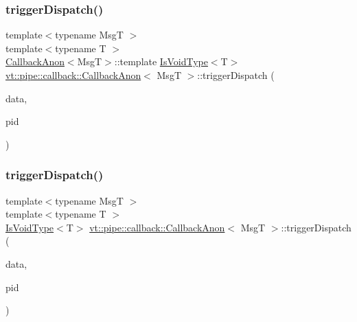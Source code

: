 \subsubsection{\texorpdfstring{trigger\+Dispatch()}{triggerDispatch()}\hspace{0.1cm}{\footnotesize\ttfamily [1/4]}}
{\footnotesize\ttfamily template$<$typename MsgT $>$ \\
template$<$typename T $>$ \\
\hyperlink{structvt_1_1pipe_1_1callback_1_1_callback_anon}{Callback\+Anon}$<$MsgT$>$\+::template \hyperlink{structvt_1_1pipe_1_1callback_1_1_callback_anon_a3aa19d4a1044d57ba4af22015331c20a}{Is\+Void\+Type}$<$T$>$ \hyperlink{structvt_1_1pipe_1_1callback_1_1_callback_anon}{vt\+::pipe\+::callback\+::\+Callback\+Anon}$<$ MsgT $>$\+::trigger\+Dispatch (\begin{DoxyParamCaption}\item[{\hyperlink{structvt_1_1pipe_1_1callback_1_1_callback_anon_ac503b95feb44bb0b60c1d69e1ed29074}{Signal\+Data\+Type} $\ast$}]{data,  }\item[{\hyperlink{namespacevt_ac9852acda74d1896f48f406cd72c7bd3}{Pipe\+Type} const \&}]{pid }\end{DoxyParamCaption})}

\mbox{\label{structvt_1_1pipe_1_1callback_1_1_callback_anon_a71cd1781a5f639ddf5e2aac775c1d397}} 
\subsubsection{\texorpdfstring{trigger\+Dispatch()}{triggerDispatch()}\hspace{0.1cm}{\footnotesize\ttfamily [2/4]}}
{\footnotesize\ttfamily template$<$typename MsgT $>$ \\
template$<$typename T $>$ \\
\hyperlink{structvt_1_1pipe_1_1callback_1_1_callback_anon_a3aa19d4a1044d57ba4af22015331c20a}{Is\+Void\+Type}$<$T$>$ \hyperlink{structvt_1_1pipe_1_1callback_1_1_callback_anon}{vt\+::pipe\+::callback\+::\+Callback\+Anon}$<$ MsgT $>$\+::trigger\+Dispatch (\begin{DoxyParamCaption}\item[{\hyperlink{structvt_1_1pipe_1_1callback_1_1_callback_anon_ac503b95feb44bb0b60c1d69e1ed29074}{Signal\+Data\+Type} $\ast$}]{data,  }\item[{\hyperlink{namespacevt_ac9852acda74d1896f48f406cd72c7bd3}{Pipe\+Type} const \&}]{pid }\end{DoxyParamCaption})\hspace{0.3cm}{\ttfamily [private]}}

